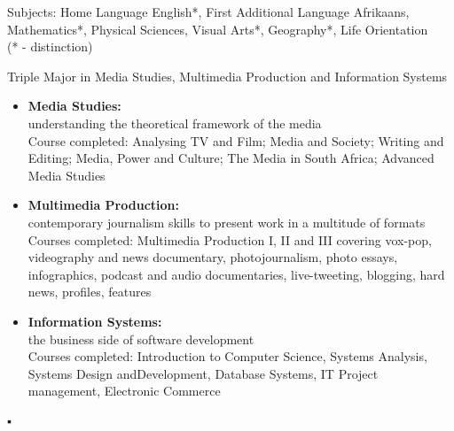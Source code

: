
Subjects:
Home Language English*, First Additional Language Afrikaans, Mathematics*, Physical Sciences,
Visual Arts*, Geography*, Life Orientation\\
(* - distinction)
\divider


Triple Major in Media Studies, Multimedia Production and Information Systems\\
\begin{itemize}
    \item \textbf{Media Studies:}\\ understanding the theoretical framework of the media\\
    Course completed: Analysing TV and Film; Media and Society; Writing and Editing; Media, Power and Culture; The Media in South Africa; Advanced Media Studies
    \item \textbf{Multimedia Production:}\\ contemporary journalism skills to present work in a multitude of formats\\
Courses completed: Multimedia Production I, II and III covering vox-pop, videography and news documentary, photojournalism, photo essays, infographics, podcast and audio documentaries, live-tweeting, blogging, hard news, profiles, features
    \item \textbf{Information Systems:}\\ the business side of software development\\
Courses completed: Introduction to Computer Science, Systems Analysis, Systems Design andDevelopment, Database Systems, IT Project management, Electronic Commerce
\end{itemize}




▪ 


\divider


\quad
\qquad


\space
\space
\vspace{2mm}
\clearpage







